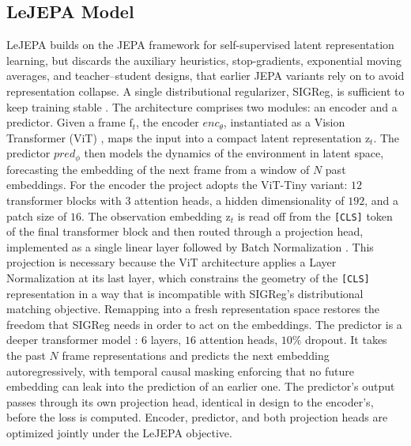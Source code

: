 \documentclass[11pt, a4paper]{article}
\begin{document}
\subsection{LeJEPA Model}
LeJEPA builds on the JEPA framework for self-supervised latent representation learning, but discards the auxiliary heuristics, stop-gradients, exponential moving averages, and teacher--student designs, that earlier JEPA variants rely on to avoid representation collapse. A single distributional regularizer, SIGReg, is sufficient to keep training stable \parencite{balestriero-2025}. The architecture comprises two modules: an encoder and a predictor. Given a frame $\mathrm{f}_t$, the encoder $enc_\theta$, instantiated as a Vision Transformer (ViT) \parencite{dosovitskiy-2020}, maps the input into a compact latent representation $\mathrm{z}_t$. The predictor $pred_\phi$ then models the dynamics of the environment in latent space, forecasting the embedding of the next frame from a window of $N$ past embeddings. For the encoder the project adopts the ViT-Tiny variant: $12$ transformer blocks with $3$ attention heads, a hidden dimensionality of $192$, and a patch size of $16$. The observation embedding $\mathrm{z}_t$ is read off from the \texttt{[CLS]} token of the final transformer block and then routed through a projection head, implemented as a single linear layer followed by Batch Normalization \parencite{ioffe-2015}. This projection is necessary because the ViT architecture applies a Layer Normalization \parencite{ba-2016} at its last layer, which constrains the geometry of the \texttt{[CLS]} representation in a way that is incompatible with SIGReg's distributional matching objective. Remapping into a fresh representation space restores the freedom that SIGReg needs in order to act on the embeddings. The predictor is a deeper transformer model \parencite{vaswani-2017}: $6$ layers, $16$ attention heads, $10\%$ dropout. It takes the past $N$ frame representations and predicts the next embedding autoregressively, with temporal causal masking enforcing that no future embedding can leak into the prediction of an earlier one. The predictor's output passes through its own projection head, identical in design to the encoder's, before the loss is computed. Encoder, predictor, and both projection heads are optimized jointly under the LeJEPA objective.
\end{document}

